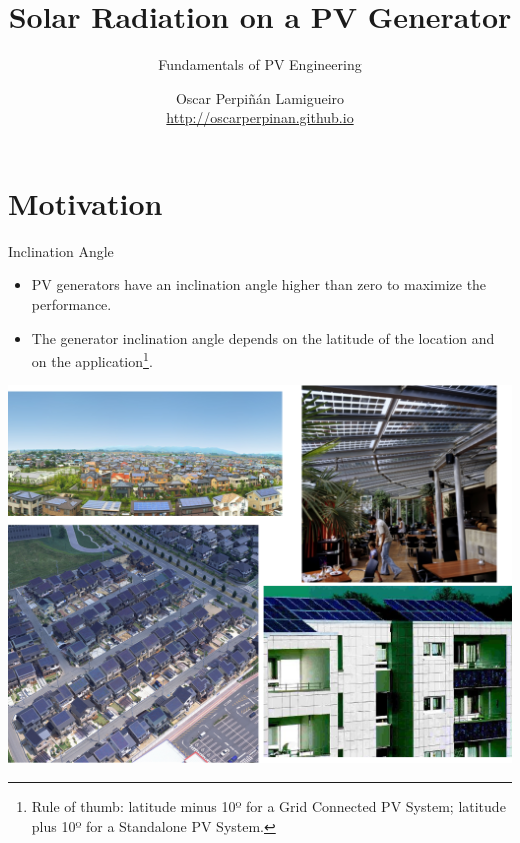 \documentclass[xcolor={usenames,svgnames,dvipsnames}]{beamer}
\author{Oscar Perpiñán Lamigueiro \\ \url{http://oscarperpinan.github.io}}
\date{}
\title{Solar Radiation on a PV Generator}
\subtitle{Fundamentals of PV Engineering}
\begin{document}
\maketitle

\section{Motivation}
\label{sec:org33f2cf4}
\begin{frame}[label={sec:orge8e3315}]{Inclination Angle}
\begin{itemize}
\item PV generators have an \alert{inclination angle higher than zero} to maximize the performance.
\item The generator inclination angle depends on the latitude of the location and on the application\footnote{Rule of thumb: latitude minus 10º for a Grid Connected PV System; latitude plus 10º for a Standalone PV System.}.
\end{itemize}

\begin{center}
\includegraphics[height=0.5\textheight]{../figs/PVUrban.png}
\end{center}
\end{frame}
\end{document}
